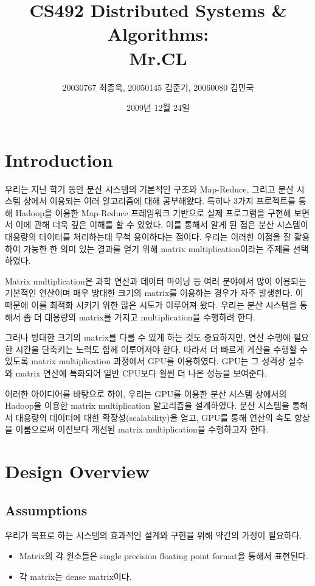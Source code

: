 \documentclass[a4paper]{article}
\begin{document}
\title{CS492 Distributed Systems \& Algorithms:\\ \textbf{Mr.CL}}
\author{20030767 최종욱, 20050145 김준기, 20060080 김민국}
\date{2009년 12월 24일}
\vspace{-40pt}
\maketitle

\begin{multicols}{2}
\section{Introduction}
우리는 지난 학기 동안 분산 시스템의 기본적인 구조와 Map-Reduce, 그리고 분산 시스템 상에서 이용되는 여러 알고리즘에 대해 공부해왔다.
특히나 3가지 프로젝트를 통해 Hadoop을 이용한 Map-Reduce 프레임워크 기반으로 실제 프로그램을 구현해 보면서 이에 관해 더욱 깊은 이해를 할 수 있었다.
이를 통해서 알게 된 점은 분산 시스템이 대용량의 데이터를 처리하는데 무척 용이하다는 점이다.
우리는 이러한 이점을 잘 활용하여 가능한 한 의미 있는 결과를 얻기 위해 matrix multiplication이라는 주제를 선택하였다.

Matrix multiplication은 과학 연산과 데이터 마이닝 등 여러 분야에서 많이 이용되는 기본적인 연산이며 매우 방대한 크기의 matrix를 이용하는 경우가 자주 발생한다.
이 때문에 이를 최적화 시키기 위한 많은 시도가 이루어져 왔다.
우리는 분산 시스템을 통해서 좀 더 대용량의 matrix를 가지고 multiplication을 수행하려 한다.

그러나 방대한 크기의 matrix를 다룰 수 있게 하는 것도 중요하지만, 연산 수행에 필요한 시간을 단축키는 노력도 함께 이루어져야 한다.
따라서 더 빠르게 계산을 수행할 수 있도록 matrix multiplication 과정에서 GPU를 이용하였다.
GPU는 그 성격상 실수와 matrix 연산에 특화되어 일반 CPU보다 훨씬 더 나은 성능을 보여준다.

이러한 아이디어를 바탕으로 하여, 우리는 GPU를 이용한 분산 시스템 상에서의 Hadoop을 이용한 matrix multiplication 알고리즘을 설계하였다.
분산 시스템을 통해서 대용량의 데이터에 대한 확장성(scalability)을 얻고, GPU를 통해 연산의 속도 향상을 이룸으로써 이전보다 개선된 matrix multiplication을 수행하고자 한다. 

\section{Design Overview}
\subsection{Assumptions}
우리가 목표로 하는 시스템의 효과적인 설계와 구현을 위해 약간의 가정이 필요하다.
\begin{itemize}
	\item Matrix의 각 원소들은 single precision floating point format을 통해서 표현된다.
	\item 각 matrix는 dense matrix이다.
\end{itemize}


\end{multicols}
\end{document}
